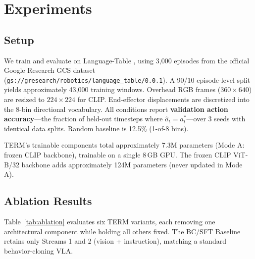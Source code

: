 \documentclass[letterpaper]{article} %
\begin{document}
\section{Experiments}

\subsection{Setup}

We train and evaluate on Language-Table \cite{lynch2023languagetable}, using 3,000 episodes from the official Google Research GCS dataset (\texttt{gs://gresearch/robotics/language\_table/0.0.1}). A 90/10 episode-level split yields approximately 43,000 training windows. Overhead RGB frames ($360{\times}640$) are resized to $224{\times}224$ for CLIP. End-effector displacements are discretized into the 8-bin directional vocabulary. All conditions report \textbf{validation action accuracy}---the fraction of held-out timesteps where $\hat{a}_t = a^*_t$---over 3 seeds with identical data splits. Random baseline is 12.5\% (1-of-8 bins).

TERM's trainable components total approximately 7.3M parameters (Mode A: frozen CLIP backbone), trainable on a single 8\,GB GPU. The frozen CLIP ViT-B/32 backbone adds approximately 124M parameters (never updated in Mode A).

\subsection{Ablation Results}

Table~\ref{tab:ablation} evaluates six TERM variants, each removing one architectural component while holding all others fixed. The BC/SFT Baseline retains only Streams 1 and 2 (vision + instruction), matching a standard behavior-cloning VLA.
\end{document}
